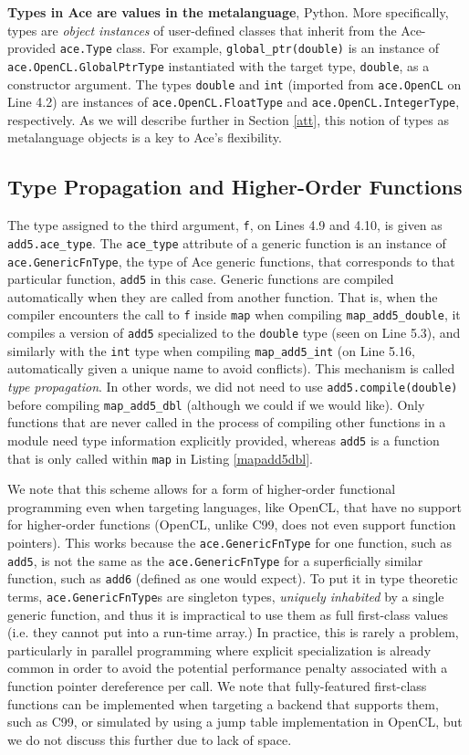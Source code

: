 \documentclass[10pt, conference, compsocconf]{IEEEtran}
\begin{document}
\textbf{Types in Ace are values in the metalanguage}, Python. More specifically, types are {\em object instances} of user-defined classes that inherit from the Ace-provided \verb|ace.Type| class. For example, \verb|global_ptr(double)| is an instance of \verb|ace.OpenCL.GlobalPtrType| instantiated with the target type, \verb|double|, as a constructor argument. The types \verb|double| and \verb|int| (imported from \verb|ace.OpenCL| on Line 4.2) are instances of \verb|ace.OpenCL.FloatType| and \verb|ace.OpenCL.IntegerType|, respectively. As we will describe further in Section \ref{att}, this notion of types as metalanguage objects is a key to Ace's flexibility.

\subsection{Type Propagation and Higher-Order Functions}
The type assigned to the third argument, \verb|f|, on Lines 4.9 and 4.10, is given as \verb|add5.ace_type|. The \verb|ace_type| attribute of a generic function is an instance of \verb|ace.GenericFnType|, the type of Ace generic functions, that corresponds to that particular function, \verb|add5| in this case. Generic functions are compiled automatically when they are called from another function. That is, when the compiler encounters the call to \verb|f| inside \verb|map| when compiling \verb|map_add5_double|, it compiles a version of \verb|add5| specialized to the \verb|double| type (seen on Line 5.3), and similarly with the \verb|int| type when compiling \verb|map_add5_int| (on Line 5.16, automatically given a unique name to avoid conflicts). This mechanism is called {\em type propagation}. In other words, we did not need to use \verb|add5.compile(double)| before compiling \verb|map_add5_dbl| (although we could if we would like). Only functions that are never called in the process of compiling other functions in a module need type information explicitly provided, whereas \verb|add5| is a function that is only called within \verb|map| in Listing \ref{mapadd5dbl}. 

We note that this scheme allows for a form of higher-order functional programming even when targeting languages, like OpenCL, that have no support for higher-order functions (OpenCL, unlike C99, does not even support function pointers). This works because the \verb|ace.GenericFnType| for one function, such as \verb|add5|, is not the same as the \verb|ace.GenericFnType| for a superficially similar function, such as \verb|add6| (defined as one would expect). To put it in type theoretic terms, \verb|ace.GenericFnType|s are singleton types, {\em uniquely inhabited} by a single generic function, and thus it is impractical to use them as full first-class values (i.e. they cannot put into a run-time array.) In practice, this is rarely a problem, particularly in parallel programming where explicit specialization is already common in order to avoid the potential performance penalty associated with a function pointer dereference per call.
We note that fully-featured first-class functions can be implemented when targeting a backend that supports them, such as C99, or simulated by using a jump table implementation in OpenCL, but we do not discuss this further due to lack of space.
\end{document}
